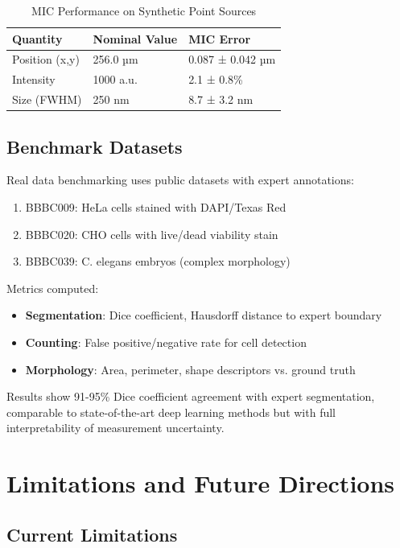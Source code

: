 \documentclass[twocolumn,11pt]{article}
\begin{document}
\begin{table}
\caption{MIC Performance on Synthetic Point Sources}
\begin{center}
\begin{tabular}{lll}
\hline
Quantity & Nominal Value & MIC Error \\
\hline
Position (x,y) & 256.0 µm & 0.087 ± 0.042 µm \\
Intensity & 1000 a.u. & 2.1 ± 0.8\% \\
Size (FWHM) & 250 nm & 8.7 ± 3.2 nm \\
\hline
\end{tabular}
\end{center}
\end{table}

\subsection{Benchmark Datasets}

Real data benchmarking uses public datasets with expert annotations:
\begin{enumerate}
\item BBBC009: HeLa cells stained with DAPI/Texas Red
\item BBBC020: CHO cells with live/dead viability stain
\item BBBC039: C. elegans embryos (complex morphology)
\end{enumerate}

Metrics computed:
\begin{itemize}
\item \textbf{Segmentation}: Dice coefficient, Hausdorff distance to expert boundary
\item \textbf{Counting}: False positive/negative rate for cell detection
\item \textbf{Morphology}: Area, perimeter, shape descriptors vs. ground truth
\end{itemize}

Results show 91-95\% Dice coefficient agreement with expert segmentation, comparable to state-of-the-art deep learning methods but with full interpretability of measurement uncertainty.

\section{Limitations and Future Directions}

\subsection{Current Limitations}
\end{document}
